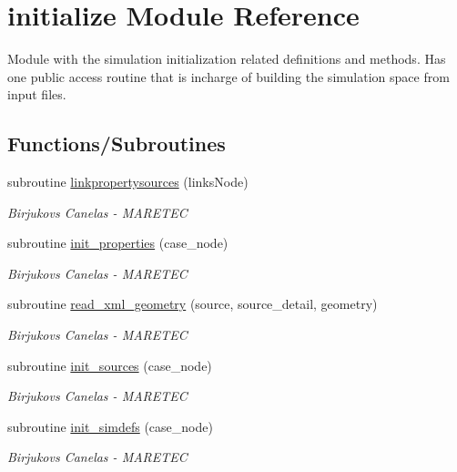 \hypertarget{namespaceinitialize}{}\section{initialize Module Reference}
\label{namespaceinitialize}


Module with the simulation initialization related definitions and methods. Has one public access routine that is incharge of building the simulation space from input files.  


\subsection*{Functions/\+Subroutines}
\begin{DoxyCompactItemize}
\item 
subroutine \mbox{\hyperlink{namespaceinitialize_ab91b27efd537a161ee9ca4b2d9efde1a}{linkpropertysources}} (links\+Node)
\begin{DoxyCompactList}\small\item\em Birjukovs Canelas -\/ M\+A\+R\+E\+T\+EC \end{DoxyCompactList}\item 
subroutine \mbox{\hyperlink{namespaceinitialize_a4640ad15e29b88467ec842f274f64b62}{init\+\_\+properties}} (case\+\_\+node)
\begin{DoxyCompactList}\small\item\em Birjukovs Canelas -\/ M\+A\+R\+E\+T\+EC \end{DoxyCompactList}\item 
subroutine \mbox{\hyperlink{namespaceinitialize_ad36e4f602dab66c06a1f0e2474e9f0a6}{read\+\_\+xml\+\_\+geometry}} (source, source\+\_\+detail, geometry)
\begin{DoxyCompactList}\small\item\em Birjukovs Canelas -\/ M\+A\+R\+E\+T\+EC \end{DoxyCompactList}\item 
subroutine \mbox{\hyperlink{namespaceinitialize_a9ed75476e5dd07928aed3442281930be}{init\+\_\+sources}} (case\+\_\+node)
\begin{DoxyCompactList}\small\item\em Birjukovs Canelas -\/ M\+A\+R\+E\+T\+EC \end{DoxyCompactList}\item 
subroutine \mbox{\hyperlink{namespaceinitialize_adb972e92da4789506ee6b62b702df2b3}{init\+\_\+simdefs}} (case\+\_\+node)
\begin{DoxyCompactList}\small\item\em Birjukovs Canelas -\/ M\+A\+R\+E\+T\+EC \end{DoxyCompactList}\item 

\end{DoxyCompactItemize}
